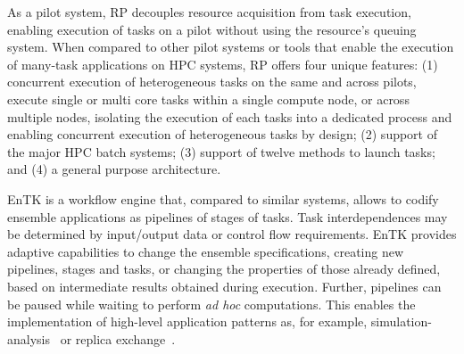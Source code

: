 \documentclass[preprint,12pt, a4paper]{elsarticle}
\begin{document}
As a pilot system, RP decouples resource acquisition from task execution,
enabling execution of tasks on a pilot without using the resource's queuing
system.
%
%
When compared to other pilot systems or tools that enable the execution of
many-task applications on HPC systems, RP offers four unique features: (1)
concurrent execution of heterogeneous tasks on the same and across pilots,
execute single or multi core tasks within a single compute node, or across
multiple nodes, isolating the execution of each tasks into a dedicated
process and enabling concurrent execution of heterogeneous tasks by design;
(2) support of the major HPC batch systems; (3) support of twelve methods to
launch tasks; and (4) a general purpose architecture.


EnTK is a workflow engine that, compared to similar systems, allows to codify
ensemble applications as pipelines of stages of tasks. Task interdependences
may be determined by input/output data or control flow requirements.
%
%
EnTK provides adaptive capabilities to change the ensemble specifications,
creating new pipelines, stages and tasks, or changing the properties of those
already defined, based on intermediate results obtained during execution.
Further, pipelines can be paused while waiting to perform \textit{ad hoc}
computations. This enables the implementation of high-level application
patterns as, for example,
simulation-analysis~\cite{balasubramanian2016extasy} or replica
exchange~\cite{treikalis2016repex}.


\end{document}
